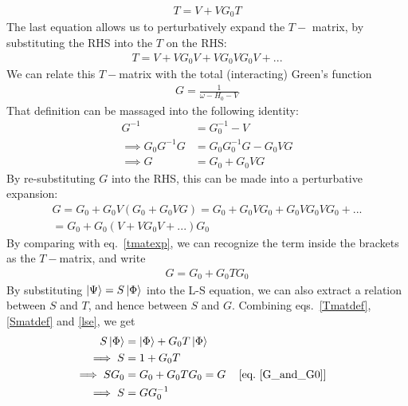 \documentclass[twoside]{report}
\numberwithin{equation}{section}
\begin{document}
\begin{equation}\begin{aligned}
	\label{TinG}
	T = V + V G_0 T
\end{aligned}\end{equation}
The last equation allows us to perturbatively expand the \(T-\) matrix, by substituting the RHS into the \(T\) on the RHS:
\begin{equation}\begin{aligned}
T = V + VG_0V + VG_0VG_0V + ...
\label{tmatexp}
\end{aligned}\end{equation}
We can relate this \(T-\)matrix with the total (interacting) Green's function
\begin{equation}\begin{aligned}
	G = \frac{1}{\omega - H_0 - V}
\end{aligned}\end{equation}
That definition can be massaged into the following identity:
\begin{equation}\begin{aligned}
	\label{GinVG}
	G^{-1} &= G_0^{-1} - V\\
	\implies G_0 G^{-1} G &= G_0 G_0^{-1} G - G_0 V G\\
	\implies G &= G_0 + G_0 V G
\end{aligned}\end{equation}
By re-substituting \(G\) into the RHS, this can be made into a perturbative expansion:
\begin{equation}\begin{aligned}
	G = G_0 + G_0 V \left(G_0 + G_0 V G\right) = G_0 + G_0 V G_0 + G_0 V G_0 V G_0 + ... \\
	= G_0 + G_0 \left( V + V G_0 V + ... \right) G_0
\end{aligned}\end{equation}
By comparing with eq.~\ref{tmatexp}, we can recognize the term inside the brackets as the \(T-\)matrix, and write
\begin{equation}\begin{aligned}
	G = G_0 + G_0 T G_0
	\label{G_and_G0}
\end{aligned}\end{equation}
By substituting \(\ket{\Psi} = S\ket{\Phi}\) into the L-S equation, we can also extract a relation between \(S\) and \(T\), and hence between \(S\) and \(G\). Combining eqs.~\ref{Tmatdef},\ref{Smatdef} and \ref{lse}, we get
\begin{align}
	S\ket{\Phi} &= \ket{\Phi} + G_0 T\ket{\Phi}\\
	\implies S &= 1 + G_0 T\\
	\implies SG_0 &= G_0 + G_0 T G_0 = G && \left[\text{eq.~\ref{G_and_G0}}\right]\\
	\implies S &= G  G_0^{-1} \label{SinG}
\end{align}
\end{document}
